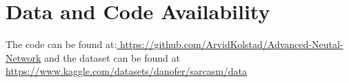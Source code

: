 \documentclass[
 reprint,
 amsmath,amssymb,
 aps,
]{revtex4-2}
\begin{document}
\section{\label{sec:datacode}Data and Code Availability} %
The code can be found at:\url{ https://github.com/ArvidKolstad/Advanced-Neutal-Network} and the dataset can be found at \url{https://www.kaggle.com/datasets/danofer/sarcasm/data}
\noindent






\noindent





\end{document}
